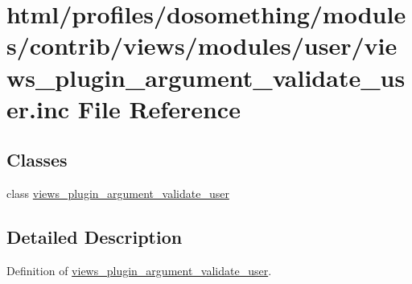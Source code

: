 \hypertarget{views__plugin__argument__validate__user_8inc}{
\section{html/profiles/dosomething/modules/contrib/views/modules/user/views\_\-plugin\_\-argument\_\-validate\_\-user.inc File Reference}
\label{views__plugin__argument__validate__user_8inc}
}
\subsection*{Classes}
\begin{DoxyCompactItemize}
\item 
class \hyperlink{classviews__plugin__argument__validate__user}{views\_\-plugin\_\-argument\_\-validate\_\-user}
\end{DoxyCompactItemize}


\subsection{Detailed Description}
Definition of \hyperlink{classviews__plugin__argument__validate__user}{views\_\-plugin\_\-argument\_\-validate\_\-user}. 